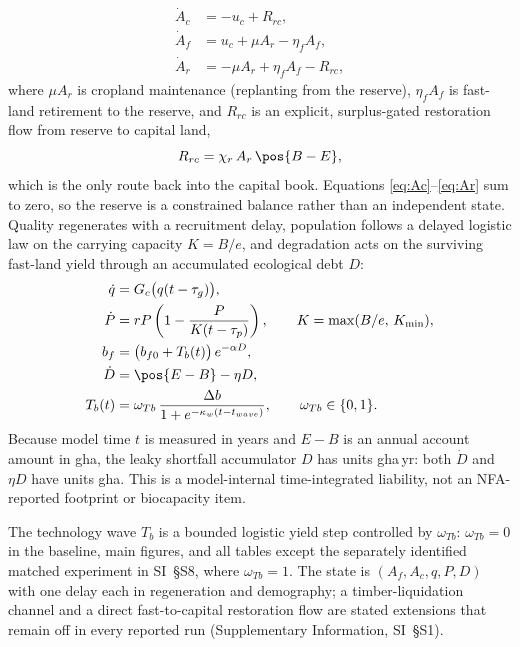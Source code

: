 \begin{align}
\dot A_c&=-u_c+R_{rc},\label{eq:Ac}\\
\dot A_f&=u_c+\mu A_r-\eta_f A_f,\label{eq:Af}\\
\dot A_r&=-\mu A_r+\eta_f A_f-R_{rc},\label{eq:Ar}
\end{align}
where $\mu A_r$ is cropland maintenance (replanting from the reserve), $\eta_f A_f$ is fast-land retirement to the reserve, and $R_{rc}$ is an explicit, surplus-gated restoration flow from reserve to capital land,
\begin{equation}\label{eq:Rrc}
R_{rc}=\chi_r\,A_r\,\pos{B-E},
\end{equation}
which is the only route back into the capital book. Equations \eqref{eq:Ac}--\eqref{eq:Ar} sum to zero, so the reserve is a constrained balance rather than an independent state. Quality regenerates with a recruitment delay, population follows a delayed logistic law \citep{Pearl1925,Hutchinson1948} on the carrying capacity $K=B/e$, and degradation acts on the surviving fast-land yield through an accumulated ecological debt $D$:
\begin{align}
\dot q&=G_c\big(q(t-\tau_g)\big),\label{eq:q}\\
\dot P&=rP\left(1-\frac{P}{K(t-\tau_p)}\right),\qquad K=\max(B/e,\,K_{\min}),\label{eq:P}\\
b_f&=\big(b_{f0}+T_b(t)\big)\,e^{-\alpha D},\label{eq:bf}\\
\dot D&=\pos{E-B}-\eta D,\label{eq:D}\\
T_b(t)&=\omega_{Tb}\,\frac{\Delta b}{1+e^{-\kappa_w(t-t_{wave})}},\qquad \omega_{Tb}\in\{0,1\}.\label{eq:Tb}
\end{align}
Because model time $t$ is measured in years and $E-B$ is an annual account amount in gha, the leaky shortfall accumulator $D$ has units gha\,yr: both $\dot D$ and $\eta D$ have units gha. This is a model-internal time-integrated liability, not an NFA-reported footprint or biocapacity item.

The technology wave $T_b$ is a bounded logistic yield step controlled by $\omega_{Tb}$: $\omega_{Tb}=0$ in the baseline, main figures, and all tables except the separately identified matched experiment in SI~\S S8, where $\omega_{Tb}=1$. The state is $(A_f,A_c,q,P,D)$ with one delay each in regeneration and demography; a timber-liquidation channel and a direct fast-to-capital restoration flow are stated extensions that remain off in every reported run (Supplementary Information, SI~\S S1).

